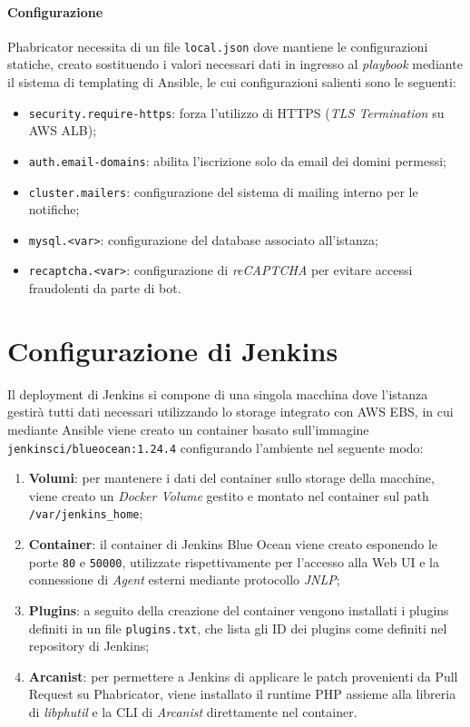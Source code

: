\documentclass[../main.tex]{subfiles}
\begin{document}
    	    \paragraph{Configurazione}
    	    Phabricator necessita di un file \verb|local.json| dove mantiene le configurazioni statiche, creato sostituendo i valori necessari dati in ingresso al \emph{playbook} mediante il sistema di templating di Ansible, le cui configurazioni salienti sono le seguenti:
    	    \begin{itemize}
    	        \item \verb|security.require-https|: forza l'utilizzo di HTTPS (\emph{TLS Termination} su AWS ALB);
    	        \item \verb|auth.email-domains|: abilita l'iscrizione solo da email dei domini permessi;
    	        \item \verb|cluster.mailers|: configurazione del sistema di mailing interno per le notifiche;
    	        \item \verb|mysql.<var>|: configurazione del database associato all'istanza;
    	        \item \verb|recaptcha.<var>|: configurazione di \emph{reCAPTCHA} per evitare accessi fraudolenti da parte di bot.
    	    \end{itemize}
    	
    	\section{Configurazione di Jenkins}
    	
    	    Il deployment di Jenkins si compone di una singola macchina dove l'istanza gestirà tutti dati necessari utilizzando lo storage integrato con AWS EBS, in cui mediante Ansible viene creato un container basato sull'immagine \\\verb|jenkinsci/blueocean:1.24.4| configurando l'ambiente nel seguente modo:
    	    \begin{enumerate}
    	        \item \textbf{Volumi}: per mantenere i dati del container sullo storage della macchine, viene creato un \emph{Docker Volume} gestito e montato nel container sul path \verb|/var/jenkins_home|;
    	        \item \textbf{Container}: il container di Jenkins Blue Ocean viene creato esponendo le porte \verb|80| e \verb|50000|, utilizzate rispettivamente per l'accesso alla Web UI e la connessione di \emph{Agent} esterni mediante protocollo \emph{JNLP};
    	        \item \textbf{Plugins}: a seguito della creazione del container vengono installati i plugins definiti in un file \verb|plugins.txt|, che lista gli ID dei plugins come definiti nel repository di Jenkins;
    	        \item \textbf{Arcanist}: per permettere a Jenkins di applicare le patch provenienti da Pull Request su Phabricator, viene installato il runtime PHP assieme alla libreria di \emph{libphutil} e la CLI di \emph{Arcanist} direttamente nel container.
    	    \end{enumerate}
    	    
\end{document}
